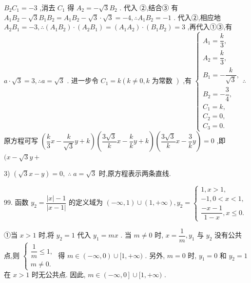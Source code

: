 ${B}_{2}{C}_{1} =  - 3$ ,消去 ${C}_{1}$ 得 ${A}_{2} =  - \sqrt{3}{B}_{2}$ . 代入 ②,结合③ 有 ${A}_{1}{B}_{2} - \sqrt{3}{B}_{1}{B}_{2} = {A}_{1}{B}_{2} - \sqrt{3} \cdot  \sqrt{3} =  - 4,\therefore {A}_{1}{B}_{2} =  - 1$ . 代入②,相应地 ${A}_{2}{B}_{1} =  - 3,\therefore \left( {{A}_{1}{B}_{2}}\right)  \cdot  \left( {{A}_{2}{B}_{1}}\right)  = \left( {{A}_{1}{A}_{2}}\right)  \cdot  \left( {{B}_{1}{B}_{2}}\right)  = 3$ ,再代入①③,有 $a \cdot  \sqrt{3} = 3,\therefore a = \sqrt{3}$ . 进一步令 ${C}_{1} = k\left( {k \neq  0,k\text{ 为常数 }}\right)$ ,有 $\left\{  \begin{array}{l} {A}_{1} = \dfrac{k}{3}, \\  {A}_{2} = \dfrac{k}{3}, \\  {B}_{1} =  - \dfrac{k}{\sqrt{3}}, \\  {B}_{2} =  - \dfrac{3}{4}, \\  {C}_{1} = k, \\  {C}_{2} = 0, \\  {C}_{3} = 0. \end{array}\right. \therefore$ 原方程可写 $\left( {\dfrac{k}{3}x - \dfrac{k}{\sqrt{3}}y + k}\right) \left( {\dfrac{3\sqrt{3}}{k}x - \dfrac{k}{k}y + k}\right) \left( {\dfrac{3\sqrt{3}}{k}x - \dfrac{3}{k}y}\right)  = 0$ ,即 $(x - \sqrt{3}y +$

3) $\left( {\sqrt{3}x - y}\right)  = 0,\;\therefore \;a = \sqrt{3}$ 时,原方程表示两条直线.

99. 函数 ${y}_{2} = \dfrac{\left| x\right|  - 1}{\left| x - 1\right| }$ 的定义域为 $\left( {-\infty ,1}\right)  \cup  \left( {1, + \infty }\right) ,{y}_{2} = \left\{  \begin{array}{l} 1,x > 1, \\   - 1,0 < x < 1, \\  \dfrac{-x - 1}{1 - x},x \leq  0. \end{array}\right.$

①当 $x > 1$ 时,将 ${y}_{2} = 1$ 代入 ${y}_{1} = {mx}$ . 当 $m \neq  0$ 时, $x = \dfrac{1}{m},{y}_{1}$ 与 ${y}_{2}$ 没有公共点,则 $\left\{  \begin{array}{l} \dfrac{1}{m} \leq  1, \\  m \neq  0. \end{array}\right.$ 得 $m \in  \left( {-\infty ,0}\right)  \cup  \lbrack 1, + \infty )$ . 另外, $m = 0$ 时, ${y}_{1} = 0$ 和 ${y}_{2} = 1$ 在 $x > 1$ 时无公共点. 因此, $m \in  \left( {-\infty ,0}\right\rbrack   \cup  \lbrack 1, + \infty )$ .

